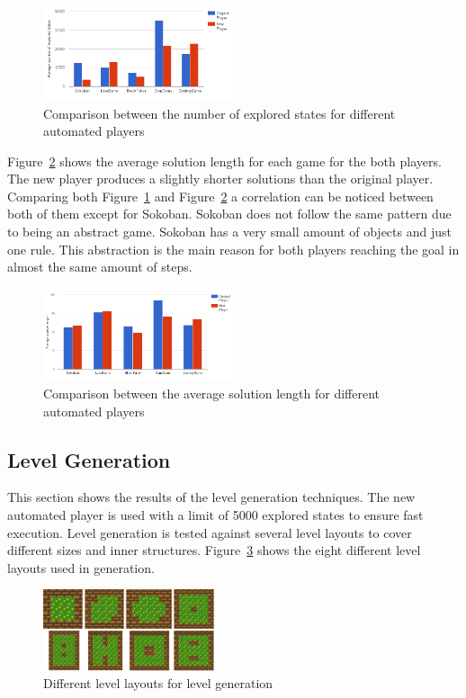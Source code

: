 \documentclass[letterpaper]{article}
\newcommand{\figref}[1]{Figure~\ref{Figure:#1}}
\begin{document}
\begin{figure}
  	\centering
    \includegraphics[width=0.5\textwidth]{Images/automatedPlayerPerformance}
    \caption{Comparison between the number of explored states for different automated players}
    \label{Figure:automatedPlayerPerformance}
\end{figure}

\figref{automatedPlayerLength} shows the average solution length for each game for the both players. The new player produces  a slightly shorter solutions than the original player. Comparing both \figref{automatedPlayerPerformance} and \figref{automatedPlayerLength} a correlation can be noticed between both of them except for Sokoban. Sokoban does not follow the same pattern due to being an abstract game. Sokoban has a very small amount of objects and just one rule. This abstraction is the main reason for both players reaching the goal in almost the same amount of steps.

\begin{figure}
  	\centering
    \includegraphics[width=0.5\textwidth]{Images/automatedPlayerLength}
    \caption{Comparison between the average solution length for different automated players}
    \label{Figure:automatedPlayerLength}
\end{figure}

\subsection{Level Generation}
This section shows the results of the level generation techniques. The new automated player is used with a limit of 5000 explored states to ensure fast execution. Level generation is tested against several level layouts to cover different sizes and inner structures. \figref{levelLayouts} shows the eight different level layouts used in generation.\\\par
\begin{figure}
  	\centering
    \includegraphics[width=0.45\textwidth]{Images/levelLayouts}
    \caption{Different level layouts for level generation}
    \label{Figure:levelLayouts}
\end{figure}
\end{document}
